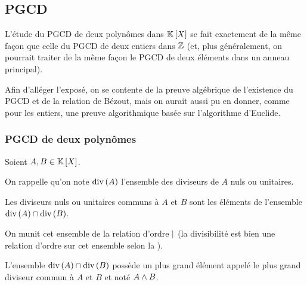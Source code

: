 \subsection{PGCD}

L'étude du PGCD de deux polynômes dans \(\poly\) se fait exactement de la même façon que celle du PGCD de deux entiers dans \(\mathbb{Z}\) (et, plus généralement, on pourrait traiter de la même façon le PGCD de deux éléments dans un anneau principal).

Afin d'alléger l'exposé, on se contente de la preuve algébrique de l'existence du PGCD et de la relation de Bézout, mais on aurait aussi pu en donner, comme pour les entiers, une preuve algorithmique basée sur l'algorithme d'Euclide.

\subsubsection{PGCD de deux polynômes}

\begin{deftheo}
Soient \(A,B\in\poly\).

On rappelle qu'on note \(\operatorname{div}\left(A\right)\) l'ensemble des diviseurs de \(A\) nuls ou unitaires.

Les diviseurs nuls ou unitaires communs à \(A\) et \(B\) sont les éléments de l'ensemble \(\operatorname{div}\left(A\right)\cap\operatorname{div}\left(B\right)\).

On munit cet ensemble de la relation d'ordre \(\mid\) (la divisibilité est bien une relation d'ordre sur cet ensemble selon la ).

L'ensemble \(\operatorname{div}\left(A\right)\cap\operatorname{div}\left(B\right)\) possède un plus grand élément appelé le plus grand diviseur commun à \(A\) et \(B\) et noté \(A\land B\).
\end{deftheo}

